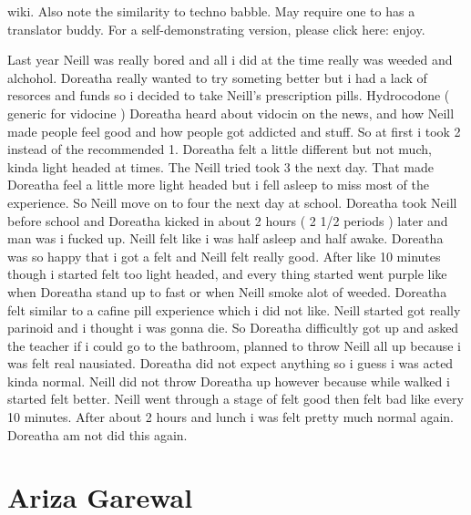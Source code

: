 \documentclass[12pt]{book}
\begin{document}
wiki. Also note the similarity to techno babble. May require one to has a translator buddy. For a self-demonstrating version, please click here: enjoy.



Last year Neill was really bored and all i did at the time really was weeded and alchohol. Doreatha really wanted to try someting better but i had a lack of resorces and funds so i decided to take Neill's prescription pills. Hydrocodone ( generic for vidocine ) Doreatha heard about vidocin on the news, and how Neill made people feel good and how people got addicted and stuff. So at first i took 2 instead of the recommended 1. Doreatha felt a little different but not much, kinda light headed at times. The Neill tried took 3 the next day. That made Doreatha feel a little more light headed but i fell asleep to miss most of the experience. So Neill move on to four the next day at school. Doreatha took Neill before school and Doreatha kicked in about 2 hours ( 2 1/2 periods ) later and man was i fucked up. Neill felt like i was half asleep and half awake. Doreatha was so happy that i got a felt and Neill felt really good. After like 10 minutes though i started felt too light headed, and every thing started went purple like when Doreatha stand up to fast or when Neill smoke alot of weeded. Doreatha felt similar to a cafine pill experience which i did not like. Neill started got really parinoid and i thought i was gonna die. So Doreatha difficultly got up and asked the teacher if i could go to the bathroom, planned to throw Neill all up because i was felt real nausiated. Doreatha did not expect anything so i guess i was acted kinda normal. Neill did not throw Doreatha up however because while walked i started felt better. Neill went through a stage of felt good then felt bad like every 10 minutes. After about 2 hours and lunch i was felt pretty much normal again. Doreatha am not did this again.



\chapter{Ariza Garewal}
\end{document}
